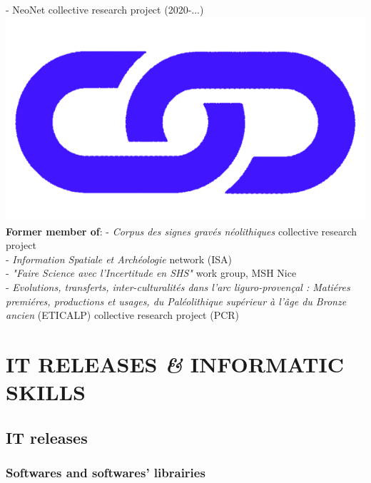 \documentclass{article}
\begin{document}
- NeoNet collective research project (2020-...) \href{https://redneonet.com/}{\includegraphics[scale=0.02]{link_darkblue.png}}\\
\bigbreak
\textbf{Former member of}:
- \textit{Corpus des signes grav\'{e}s n\'{e}olithiques} collective research project\\
- \textit{Information Spatiale et Arch\'{e}ologie} network (ISA)\\ 
- \textit{"Faire Science avec l'Incertitude en SHS"} work group, MSH Nice\\ 
- \textit{Evolutions, transferts, inter-culturalit\'{e}s dans l'arc liguro-proven\c{c}al : Mati\'{e}res premi\'{e}res, productions et usages, du Pal\'{e}olithique sup\'{e}rieur \`{a} l'\^{a}ge du Bronze ancien} (ETICALP) collective research project (PCR)\\


\section{IT RELEASES \textit{\&} INFORMATIC SKILLS}

\subsection*{IT releases}

\subsubsection*{Softwares and softwares' librairies}
\end{document}
